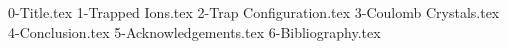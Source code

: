 \documentclass[%
 reprint,
 amsmath,amssymb,
 aps,
]{revtex4-2}
\begin{document}

{0-Title.tex}
{1-Trapped Ions.tex}
{2-Trap Configuration.tex}
{3-Coulomb Crystals.tex}
{4-Conclusion.tex}
{5-Acknowledgements.tex}
{6-Bibliography.tex}
\end{document}
